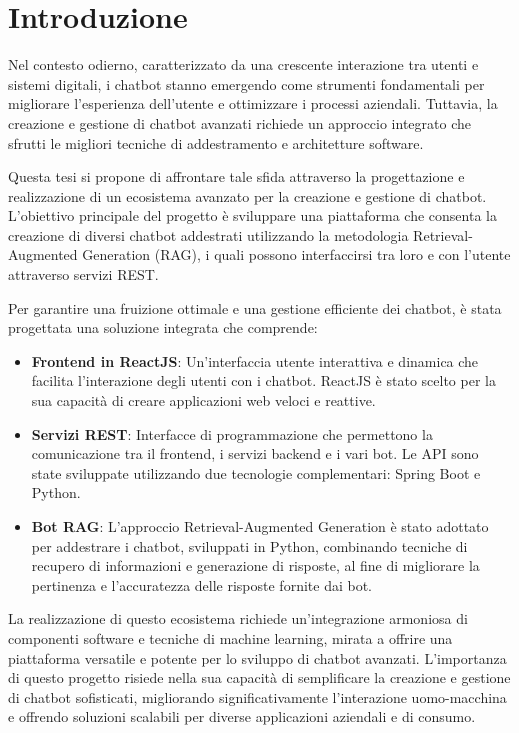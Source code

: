 \documentclass[a4paper,twoside,12pt]{toptesi}
\makeatletter
\def\cleardoublepage{\clearpage\if@twoside \ifodd\c@page\else
    \hbox{}
    \vspace*{\fill}
    \vspace{\fill}
    \thispagestyle{empty}
    \newpage
    \if@twocolumn\hbox{}\newpage\fi\fi\fi}
\makeatother
\begin{document}
\tableofcontents

\cleardoublepage

\setcounter{page}{1}

\chapter*{Introduzione}
Nel contesto odierno, caratterizzato da una crescente interazione tra utenti e sistemi digitali, i chatbot stanno emergendo come strumenti fondamentali per migliorare l'esperienza dell'utente e ottimizzare i processi aziendali. Tuttavia, la creazione e gestione di chatbot avanzati richiede un approccio integrato che sfrutti le migliori tecniche di addestramento e architetture software.

Questa tesi si propone di affrontare tale sfida attraverso la progettazione e realizzazione di un ecosistema avanzato per la creazione e gestione di chatbot. L'obiettivo principale del progetto è sviluppare una piattaforma che consenta la creazione di diversi chatbot addestrati utilizzando la metodologia Retrieval-Augmented Generation (RAG), i quali possono interfaccirsi tra loro e con l'utente attraverso servizi REST.

Per garantire una fruizione ottimale e una gestione efficiente dei chatbot, è stata progettata una soluzione integrata che comprende:
\begin{itemize}
\item \textbf{Frontend in ReactJS}: Un'interfaccia utente interattiva e dinamica che facilita l'interazione degli utenti con i chatbot. ReactJS è stato scelto per la sua capacità di creare applicazioni web veloci e reattive.

\item \textbf{Servizi REST}: Interfacce di programmazione che permettono la comunicazione tra il frontend, i servizi backend e i vari bot. Le API sono state sviluppate utilizzando due tecnologie complementari: Spring Boot e Python.

\item \textbf{Bot RAG}: L'approccio Retrieval-Augmented Generation è stato adottato per addestrare i chatbot, sviluppati in Python, combinando tecniche di recupero di informazioni e generazione di risposte, al fine di migliorare la pertinenza e l'accuratezza delle risposte fornite dai bot.
\end{itemize}
La realizzazione di questo ecosistema richiede un'integrazione armoniosa di componenti software e tecniche di machine learning, mirata a offrire una piattaforma versatile e potente per lo sviluppo di chatbot avanzati. L'importanza di questo progetto risiede nella sua capacità di semplificare la creazione e gestione di chatbot sofisticati, migliorando significativamente l'interazione uomo-macchina e offrendo soluzioni scalabili per diverse applicazioni aziendali e di consumo.
\end{document}
